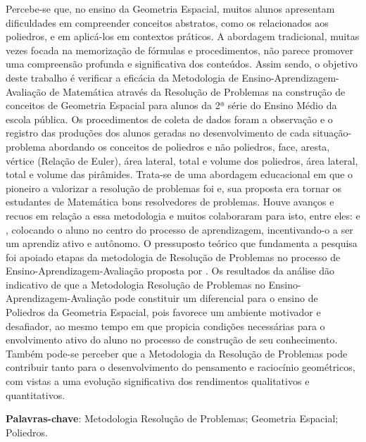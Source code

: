 
\setlength{\absparsep}{18pt} %
\begin{resumo}

	Percebe-se que, no ensino da Geometria Espacial, muitos alunos apresentam dificuldades em compreender conceitos abstratos, como os relacionados aos poliedros, e em aplicá-los em contextos práticos. A abordagem tradicional, muitas vezes focada na memorização de fórmulas e procedimentos, não parece promover uma compreensão profunda e significativa dos conteúdos. Assim sendo, o objetivo deste trabalho é verificar a eficácia da Metodologia de Ensino-Aprendizagem-Avaliação de Matemática através da Resolução de Problemas na construção de conceitos de Geometria Espacial para alunos da 2ª série do Ensino Médio da escola pública. Os procedimentos de coleta de dados foram a observação e o registro das produções dos alunos geradas no desenvolvimento de cada situação-problema abordando os conceitos de poliedros e não poliedros, face, aresta, vértice (Relação de Euler), área lateral, total e volume dos poliedros, área lateral, total e volume das pirâmides. Trata-se de uma abordagem educacional em que o pioneiro a valorizar a resolução de problemas foi  e, sua proposta era tornar os estudantes de Matemática bons resolvedores de problemas. Houve avanços e recuos em relação a essa metodologia e muitos colaboraram para isto, entre eles:  e , colocando o aluno no centro do processo de aprendizagem, incentivando-o a ser um aprendiz ativo e autônomo. O pressuposto teórico que fundamenta a pesquisa foi apoiado etapas da metodologia de Resolução de Problemas no processo de Ensino-Aprendizagem-Avaliação proposta por . Os resultados da análise dão indicativo de que a Metodologia Resolução de Problemas no Ensino-Aprendizagem-Avaliação pode constituir um diferencial para o ensino de Poliedros da Geometria Espacial, pois favorece um ambiente motivador e desafiador, ao mesmo tempo em que propicia condições necessárias para o envolvimento ativo do aluno no processo de construção de seu conhecimento. Também pode-se perceber que a Metodologia da Resolução de Problemas pode contribuir tanto para o desenvolvimento do pensamento e raciocínio geométricos, com vistas a uma evolução significativa dos rendimentos qualitativos e quantitativos.

	\textbf{Palavras-chave}: Metodologia Resolução de Problemas; Geometria Espacial; Poliedros.

\end{resumo}
